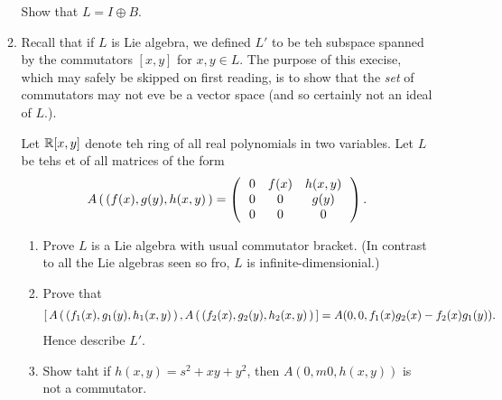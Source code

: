 \documentclass[12pt,a4paper]{report}
\begin{document}
\begin{enumerate}[label=2.\arabic*]
\begin{enumerate}
	Show that $L=I\oplus B$.
	
	\item Recall that if $L$ is  Lie algebra, we defined $L'$ to be teh subspace spanned by the commutators $[x,y]$ for $x,y\in L$.  The purpose of this execise, which may safely be skipped on first reading, is to show that the \textit{set} of commutators may not eve be a vector space (and so certainly not an ideal of $L$.).
	
	Let $\mathbb{R}[x,y]$ denote teh ring of all real polynomials in two variables.  Let $L$ be tehs et of all matrices of the form 
	\begin{align*}
		A\left (\, (f(x), g(y), h(x,y) \,\right ) = \left (\,  \begin{array}{c c c} 0&f(x)&h(x,y) \\ 0 & 0 & g(y) \\ 0 & 0 & 0 \end{array}  \,\right ).
	\end{align*}\begin{enumerate}[label=(\roman*)]
		\item Prove $L$ is a Lie algebra with usual commutator bracket. (In contrast to all the Lie algebras seen so fro, $L$ is infinite-dimensionial.)
		\item Prove that
		\begin{align*}
			\left [\, A\left (\, (f_1(x), g_1(y), h_1(x,y) \,\right ), A\left (\, (f_2(x), g_2(y), h_2(x,y) \,\right ) \,\right ] = A(0,0,f_1(x)g_2(x)-f_2(x)g_1(y)).
		\end{align*}Hence describe $L'$.
		
		\item Show taht if $h(x,y)=s^2+xy+y^2$, then $A(0,m0,h(x,y))$ is not a commutator.
	
	\end{enumerate}
\end{enumerate}


\end{enumerate}
\end{document}
